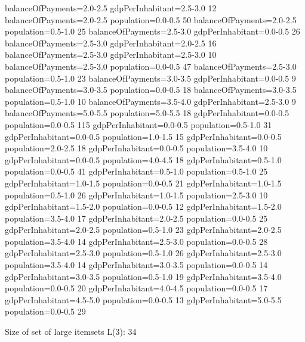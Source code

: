 balanceOfPayments=2.0-2.5 gdpPerInhabitant=2.5-3.0 12
balanceOfPayments=2.0-2.5 population=0.0-0.5 50
balanceOfPayments=2.0-2.5 population=0.5-1.0 25
balanceOfPayments=2.5-3.0 gdpPerInhabitant=0.0-0.5 26
balanceOfPayments=2.5-3.0 gdpPerInhabitant=2.0-2.5 16
balanceOfPayments=2.5-3.0 gdpPerInhabitant=2.5-3.0 10
balanceOfPayments=2.5-3.0 population=0.0-0.5 47
balanceOfPayments=2.5-3.0 population=0.5-1.0 23
balanceOfPayments=3.0-3.5 gdpPerInhabitant=0.0-0.5 9
balanceOfPayments=3.0-3.5 population=0.0-0.5 18
balanceOfPayments=3.0-3.5 population=0.5-1.0 10
balanceOfPayments=3.5-4.0 gdpPerInhabitant=2.5-3.0 9
balanceOfPayments=5.0-5.5 population=5.0-5.5 18
gdpPerInhabitant=0.0-0.5 population=0.0-0.5 115
gdpPerInhabitant=0.0-0.5 population=0.5-1.0 31
gdpPerInhabitant=0.0-0.5 population=1.0-1.5 15
gdpPerInhabitant=0.0-0.5 population=2.0-2.5 18
gdpPerInhabitant=0.0-0.5 population=3.5-4.0 10
gdpPerInhabitant=0.0-0.5 population=4.0-4.5 18
gdpPerInhabitant=0.5-1.0 population=0.0-0.5 41
gdpPerInhabitant=0.5-1.0 population=0.5-1.0 25
gdpPerInhabitant=1.0-1.5 population=0.0-0.5 21
gdpPerInhabitant=1.0-1.5 population=0.5-1.0 26
gdpPerInhabitant=1.0-1.5 population=2.5-3.0 10
gdpPerInhabitant=1.5-2.0 population=0.0-0.5 12
gdpPerInhabitant=1.5-2.0 population=3.5-4.0 17
gdpPerInhabitant=2.0-2.5 population=0.0-0.5 25
gdpPerInhabitant=2.0-2.5 population=0.5-1.0 23
gdpPerInhabitant=2.0-2.5 population=3.5-4.0 14
gdpPerInhabitant=2.5-3.0 population=0.0-0.5 28
gdpPerInhabitant=2.5-3.0 population=0.5-1.0 26
gdpPerInhabitant=2.5-3.0 population=3.5-4.0 14
gdpPerInhabitant=3.0-3.5 population=0.0-0.5 14
gdpPerInhabitant=3.0-3.5 population=0.5-1.0 19
gdpPerInhabitant=3.5-4.0 population=0.0-0.5 20
gdpPerInhabitant=4.0-4.5 population=0.0-0.5 17
gdpPerInhabitant=4.5-5.0 population=0.0-0.5 13
gdpPerInhabitant=5.0-5.5 population=0.0-0.5 29

Size of set of large itemsets L(3): 34

